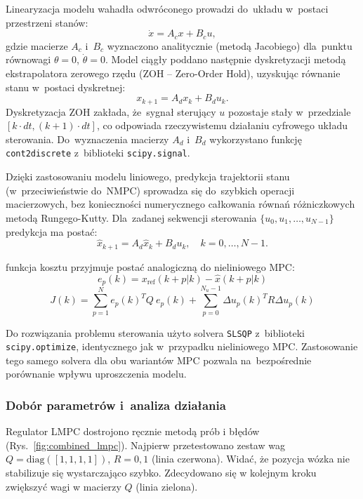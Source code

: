 Linearyzacja modelu wahadła odwróconego prowadzi do~układu w~postaci 
przestrzeni stanów:
\begin{equation}
    \dot{x} = A_c x + B_c u,
\end{equation}
gdzie macierze $A_c$ i~$B_c$ wyznaczono analitycznie (metodą Jacobiego) dla~punktu 
równowagi $\theta = 0$, $\dot{\theta} = 0$. Model ciągły poddano następnie 
dyskretyzacji metodą ekstrapolatora zerowego rzędu (ZOH -- Zero-Order Hold), 
uzyskując równanie stanu w~postaci dyskretnej:
\begin{equation}
    x_{k+1} = A_d x_k + B_d u_k.
\end{equation}
Dyskretyzacja ZOH zakłada, że~sygnał sterujący $u$ pozostaje stały w~przedziale 
$[k \cdot dt, (k+1) \cdot dt]$, co odpowiada rzeczywistemu działaniu cyfrowego 
układu sterowania. Do~wyznaczenia macierzy $A_d$ i~$B_d$ wykorzystano funkcję 
\texttt{cont2discrete} z~biblioteki \texttt{scipy.signal}.

Dzięki zastosowaniu modelu liniowego, predykcja trajektorii stanu (w~przeciwieństwie 
do~NMPC) sprowadza się do~szybkich operacji macierzowych, bez konieczności 
numerycznego całkowania równań różniczkowych metodą Rungego-Kutty. Dla~zadanej 
sekwencji sterowania $\{u_0, u_1, \ldots, u_{N-1}\}$ predykcja ma postać:
\begin{equation}
    \hat{x}_{k+1} = A_d \hat{x}_k + B_d u_k, \quad k = 0, \ldots, N-1.
\end{equation}

funkcja kosztu przyjmuje postać analogiczną do nieliniowego MPC:
\begin{equation}
e_{p}(k)={x}_{\mathrm{ref}}(k+p|k) - \hat{x}(k+p|k)
\end{equation}
\begin{equation} 
J(k)=\sum_{p=1}^{N}e_{p}(k)^{T}Q~e_{p}(k)+\sum_{p=0}^{N_{u}-1}\Delta u_{p}(k)^{T}R\Delta u_{p}(k)
\end{equation}

Do rozwiązania problemu sterowania użyto solvera \texttt{SLSQP} z~biblioteki 
\texttt{scipy.optimize}, identycznego jak w~przypadku nieliniowego MPC. 
Zastosowanie tego samego solvera dla obu wariantów MPC pozwala na~bezpośrednie 
porównanie wpływu uproszczenia modelu.

\subsubsection{Dobór parametrów i~analiza działania}

Regulator LMPC dostrojono ręcznie metodą prób i błędów (Rys.~\ref{fig:combined_lmpc}).
Najpierw przetestowano zestaw wag $Q=\text{diag}([1, 1, 1, 1])$, $R=0,1$ (linia czerwona). 
Widać, że pozycja wózka nie stabilizuje się wystarczająco szybko.
Zdecydowano się w kolejnym kroku zwiększyć wagi w macierzy $Q$ (linia zielona).

